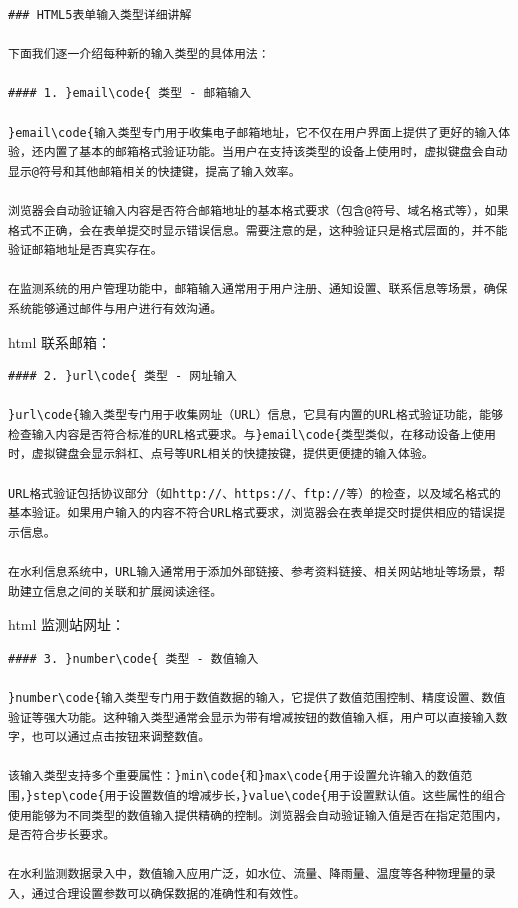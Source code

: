 \begin{lstlisting}
### HTML5表单输入类型详细讲解

下面我们逐一介绍每种新的输入类型的具体用法：

#### 1. }email\code{ 类型 - 邮箱输入

}email\code{输入类型专门用于收集电子邮箱地址，它不仅在用户界面上提供了更好的输入体验，还内置了基本的邮箱格式验证功能。当用户在支持该类型的设备上使用时，虚拟键盘会自动显示@符号和其他邮箱相关的快捷键，提高了输入效率。

浏览器会自动验证输入内容是否符合邮箱地址的基本格式要求（包含@符号、域名格式等），如果格式不正确，会在表单提交时显示错误信息。需要注意的是，这种验证只是格式层面的，并不能验证邮箱地址是否真实存在。

在监测系统的用户管理功能中，邮箱输入通常用于用户注册、通知设置、联系信息等场景，确保系统能够通过邮件与用户进行有效沟通。

\end{lstlisting}

html 联系邮箱：

\begin{lstlisting}
#### 2. }url\code{ 类型 - 网址输入

}url\code{输入类型专门用于收集网址（URL）信息，它具有内置的URL格式验证功能，能够检查输入内容是否符合标准的URL格式要求。与}email\code{类型类似，在移动设备上使用时，虚拟键盘会显示斜杠、点号等URL相关的快捷按键，提供更便捷的输入体验。

URL格式验证包括协议部分（如http://、https://、ftp://等）的检查，以及域名格式的基本验证。如果用户输入的内容不符合URL格式要求，浏览器会在表单提交时提供相应的错误提示信息。

在水利信息系统中，URL输入通常用于添加外部链接、参考资料链接、相关网站地址等场景，帮助建立信息之间的关联和扩展阅读途径。

\end{lstlisting}

html 监测站网址：

\begin{lstlisting}
#### 3. }number\code{ 类型 - 数值输入

}number\code{输入类型专门用于数值数据的输入，它提供了数值范围控制、精度设置、数值验证等强大功能。这种输入类型通常会显示为带有增减按钮的数值输入框，用户可以直接输入数字，也可以通过点击按钮来调整数值。

该输入类型支持多个重要属性：}min\code{和}max\code{用于设置允许输入的数值范围，}step\code{用于设置数值的增减步长，}value\code{用于设置默认值。这些属性的组合使用能够为不同类型的数值输入提供精确的控制。浏览器会自动验证输入值是否在指定范围内，是否符合步长要求。

在水利监测数据录入中，数值输入应用广泛，如水位、流量、降雨量、温度等各种物理量的录入，通过合理设置参数可以确保数据的准确性和有效性。

\end{lstlisting}

